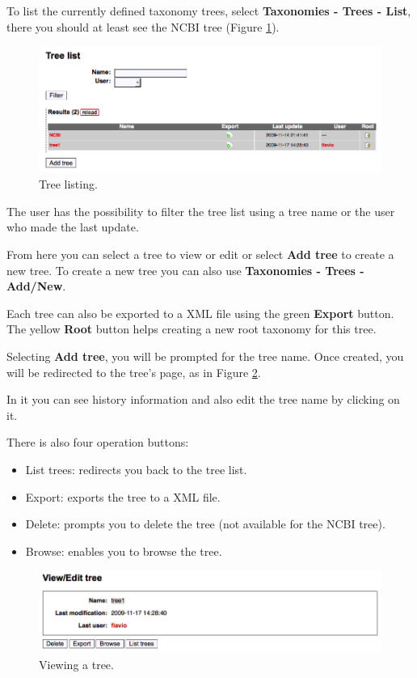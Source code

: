 To list the currently defined taxonomy trees, select \textbf{Taxonomies - Trees - List}, there
you should at least see the NCBI tree (Figure \ref{fig:tree_list}).

\begin{figure}[H]
  \centering
    \includegraphics[scale=0.4]{tree_list.png}
  \caption{Tree listing.}
  \label{fig:tree_list}
\end{figure}

The user has the possibility to filter the tree list using a tree name or the user who made the last update.

From here you can select a tree to view or edit or select \textbf{Add tree} to create a new tree.
To create a new tree you can also use \textbf{Taxonomies - Trees - Add/New}.

Each tree can also be exported to a XML file using the green \textbf{Export} button.
The yellow \textbf{Root} button helps creating a new root taxonomy for this tree.

Selecting \textbf{Add tree}, you will be prompted for the tree name. Once created, you will be
redirected to the tree's page, as in Figure \ref{fig:view_tree}.

In it you can see history information and also edit the tree name by clicking on it.

There is also four operation buttons:

\begin{itemize}
  \item List trees: redirects you back to the tree list.
  \item Export: exports the tree to a XML file.
  \item Delete: prompts you to delete the tree (not available for the NCBI tree).
  \item Browse: enables you to browse the tree.
\end{itemize}

\begin{figure}[H]
  \centering
    \includegraphics[scale=0.4]{view_tree.png}
  \caption{Viewing a tree.}
  \label{fig:view_tree}
\end{figure}

